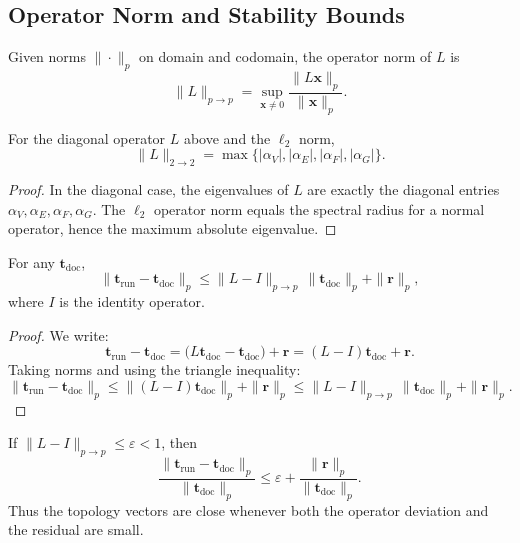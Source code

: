 \documentclass[11pt]{article}
\begin{document}
\subsection{Operator Norm and Stability Bounds}

\begin{definition}
Given norms \(\|\cdot\|_p\) on domain and codomain, the operator norm of \(L\) is
\[
\|L\|_{p \to p} = \sup_{\mathbf{x}\neq 0} \frac{\|L\mathbf{x}\|_p}{\|\mathbf{x}\|_p}.
\]
\end{definition}

\begin{lemma}
For the diagonal operator \(L\) above and the \(\ell_2\) norm,
\[
\|L\|_{2\to 2} = \max\{|\alpha_V|,|\alpha_E|,|\alpha_F|,|\alpha_G|\}.
\]
\end{lemma}

\begin{proof}
In the diagonal case, the eigenvalues of \(L\) are exactly the diagonal entries \(\alpha_V,\alpha_E,\alpha_F,\alpha_G\). The \(\ell_2\) operator norm equals the spectral radius for a normal operator, hence the maximum absolute eigenvalue.
\end{proof}

\begin{lemma}
For any \(\mathbf{t}_{\mathrm{doc}}\),
\[
\|\mathbf{t}_{\mathrm{run}} - \mathbf{t}_{\mathrm{doc}}\|_p
\le
\|L - I\|_{p\to p}\,\|\mathbf{t}_{\mathrm{doc}}\|_p + \|\mathbf{r}\|_p,
\]
where \(I\) is the identity operator.
\end{lemma}

\begin{proof}
We write:
\[
\mathbf{t}_{\mathrm{run}} - \mathbf{t}_{\mathrm{doc}}
= \big(L\mathbf{t}_{\mathrm{doc}} - \mathbf{t}_{\mathrm{doc}}\big) + \mathbf{r}
= (L - I)\mathbf{t}_{\mathrm{doc}} + \mathbf{r}.
\]
Taking norms and using the triangle inequality:
\[
\|\mathbf{t}_{\mathrm{run}} - \mathbf{t}_{\mathrm{doc}}\|_p
\le
\|(L - I)\mathbf{t}_{\mathrm{doc}}\|_p + \|\mathbf{r}\|_p
\le
\|L - I\|_{p\to p}\,\|\mathbf{t}_{\mathrm{doc}}\|_p + \|\mathbf{r}\|_p.
\]
\end{proof}

\begin{corollary}
If \(\|L - I\|_{p\to p} \le \varepsilon < 1\), then
\[
\frac{\|\mathbf{t}_{\mathrm{run}} - \mathbf{t}_{\mathrm{doc}}\|_p}{\|\mathbf{t}_{\mathrm{doc}}\|_p}
\le
\varepsilon + \frac{\|\mathbf{r}\|_p}{\|\mathbf{t}_{\mathrm{doc}}\|_p}.
\]
Thus the topology vectors are close whenever both the operator deviation and the residual are small.
\end{corollary}
\end{document}
